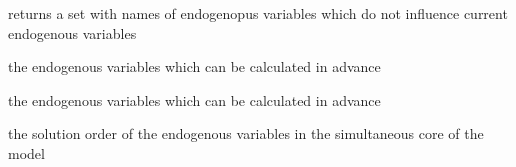 \documentclass[letterpaper,10pt,english]{sphinxmanual}
\begin{document}
\begin{fulllineitems}

\begin{fulllineitems}
\label{\detokenize{core/modelclass:modelclass.Graph_Mixin.epivar}}
\pysigstartsignatures
{}
\pysigstopsignatures
\sphinxAtStartPar
returns a set with names of endogenopus variables which do not influence
current endogenous variables

\end{fulllineitems}


\begin{fulllineitems}
\label{\detokenize{core/modelclass:modelclass.Graph_Mixin.preorder}}
\pysigstartsignatures
{}
\pysigstopsignatures
\sphinxAtStartPar
the endogenous variables which can be calculated in advance

\end{fulllineitems}


\begin{fulllineitems}
\label{\detokenize{core/modelclass:modelclass.Graph_Mixin.epiorder}}
\pysigstartsignatures
{}
\pysigstopsignatures
\sphinxAtStartPar
the endogenous variables which can be calculated in advance

\end{fulllineitems}


\begin{fulllineitems}
\label{\detokenize{core/modelclass:modelclass.Graph_Mixin.coreorder}}
\pysigstartsignatures
{}
\pysigstopsignatures
\sphinxAtStartPar
the solution order of the endogenous variables in the simultaneous core of the model


\end{fulllineitems}
\end{fulllineitems}
\end{document}

